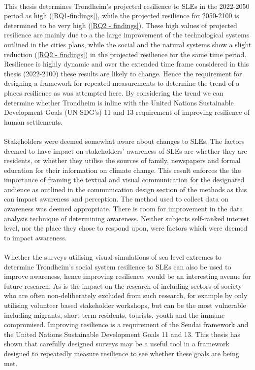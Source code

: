 \paragraph{}
This thesis determines Trondheim's projected resilience to SLEs in the 2022-2050 period as high (\ref{RQ1-findings}), while the projected resilience for 2050-2100 is determined to be very high (\ref{RQ2 - findings}). These high values of projected resilience are mainly due to a the large improvement of the technological systems outlined in the cities plans, while the social and the natural systems show a slight reduction (\ref{RQ2 - findings}) in the projected resilience for the same time period. Resilience is highly dynamic and over the extended time frame considered in this thesis (2022-2100) these results are likely to change. Hence the requirement for designing a framework for repeated measurements to determine the trend of a places resilience as was attempted here. By considering the trend we can determine whether Trondheim is inline with the United Nations Sustainable Development Goals (UN SDG’s) 11 and 13 requirement of improving resilience of human settlements.

\paragraph{}
Stakeholders were deemed somewhat aware about changes to SLEs. The factors deemed to have impact on stakeholders' awareness of SLEs are whether they are residents, or whether they utilise the sources of family, newspapers and formal education for their information on climate change. This result enforces the the importance of framing the textual and visual communication for the designated audience as outlined in the communication design section of the methods as this can impact awareness and perception.  The method used to collect data on awareness was deemed appropriate. There is room for improvement in the data analysis technique of determining awareness. Neither subjects self-ranked interest level, nor the place they chose to respond upon, were factors which were deemed to impact awareness.
\paragraph{}



Whether the surveys utilising visual simulations of sea level extremes to determine Trondheim's social system resilience to SLEs can also be used to improve awareness, hence improving resilience, would be an interesting avenue for future research. As is the impact on the research of including sectors of society who are often non-deliberately excluded from such research, for example by only utilising volunteer based stakeholder workshops, but can be the most vulnerable including migrants, short term residents, tourists, youth and the immune compromised. Improving resilience is a requirement of the Sendai framework and the United Nations Sustainable Development Goals 11 and 13. This thesis has shown that carefully designed surveys may be a useful tool in a framework designed to repeatedly measure resilience to see whether these goals are being met.


